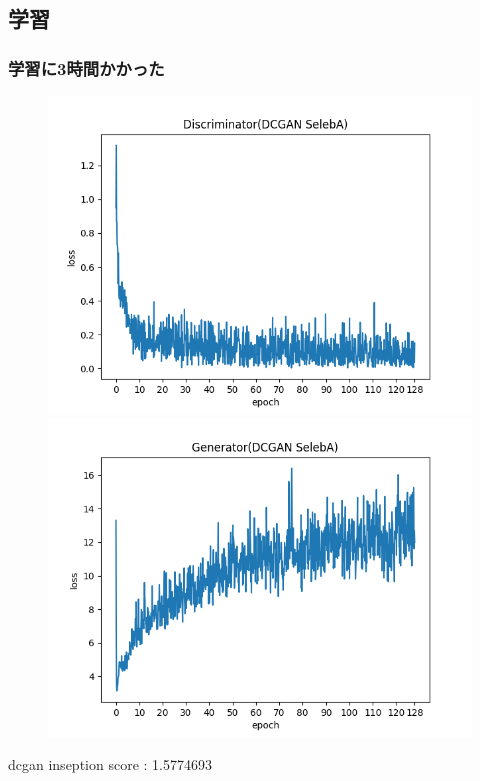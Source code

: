\documentclass[dvipdfmx,12pt]{beamer}
\begin{document}
\subsection{学習}
\begin{frame}
	\frametitle{学習に3時間かかった}
	\begin{figure}[htbp]
	\begin{center}
	\includegraphics[width=0.5\hsize]{./dcgan_D.png}
	\includegraphics[width=0.5\hsize]{./dcgan_G.png}
	\end{center}
	\end{figure}
	dcgan inseption score : 1.5774693
\end{frame}
\end{document}
